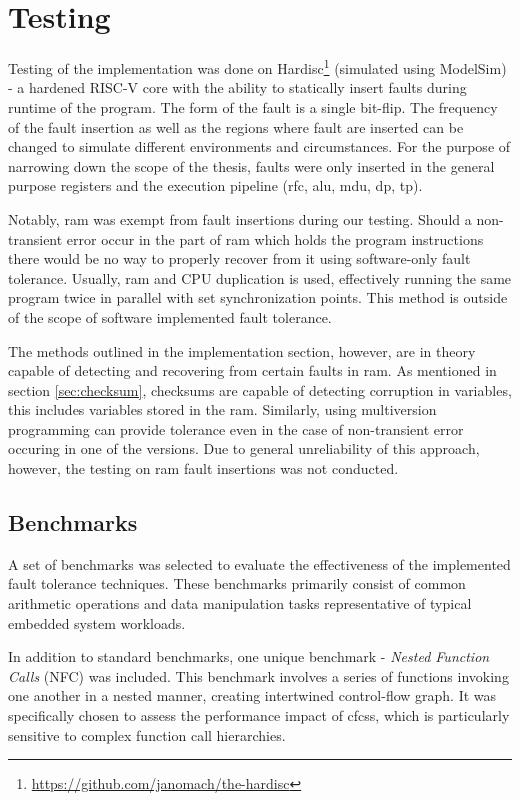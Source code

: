 \section{Testing}

Testing of the implementation was done on Hardisc\footnote{\url{https://github.com/janomach/the-hardisc}} (simulated using ModelSim) - a hardened RISC-V core with the ability to statically insert faults during runtime of the program. The form of the fault is a single bit-flip. The frequency of the fault insertion as well as the regions where fault are inserted can be changed to simulate different environments and circumstances. For the purpose of narrowing down the scope of the thesis, faults were only inserted in the general purpose registers and the execution pipeline (\acrshort{rfc}, \acrshort{alu}, \acrshort{mdu}, \acrshort{dp}, \acrshort{tp}).

Notably, \acrfull{ram} was exempt from fault insertions during our testing. Should a non-transient error occur in the part of \acrshort{ram} which holds the program instructions there would be no way to properly recover from it using software-only fault tolerance. Usually, \acrshort{ram} and CPU duplication is used, effectively running the same program twice in parallel with set synchronization points. This method is outside of the scope of software implemented fault tolerance.

The methods outlined in the implementation section, however, are in theory capable of detecting and recovering from certain faults in \acrshort{ram}. As mentioned in section \ref{sec:checksum}, checksums are capable of detecting corruption in variables, this includes variables stored in the \acrshort{ram}. Similarly, using multiversion programming can provide tolerance even in the case of non-transient error occuring in one of the versions. Due to general unreliability of this approach, however, the testing on \acrshort{ram} fault insertions was not conducted.

\subsection{Benchmarks}

A set of benchmarks was selected to evaluate the effectiveness of the implemented fault tolerance techniques. These benchmarks primarily consist of common arithmetic operations and data manipulation tasks representative of typical embedded system workloads. 

In addition to standard benchmarks, one unique benchmark - \textit{Nested Function Calls} (NFC) was included. This benchmark involves a series of functions invoking one another in a nested manner, creating intertwined control-flow graph. It was specifically chosen to assess the performance impact of \acrshort{cfcss}, which is particularly sensitive to complex function call hierarchies.

